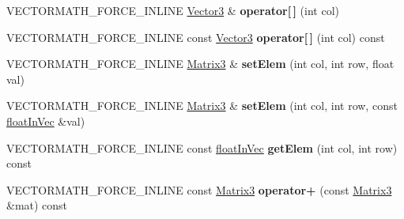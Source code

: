 \begin{DoxyCompactItemize}
\mbox{\label{classVectormath_1_1Aos_1_1Matrix3_a6978cc9868019aedcbd3eeaf9f5d48f1}} 
V\+E\+C\+T\+O\+R\+M\+A\+T\+H\+\_\+\+F\+O\+R\+C\+E\+\_\+\+I\+N\+L\+I\+NE \hyperlink{classVectormath_1_1Aos_1_1Vector3}{Vector3} \& {\bfseries operator\mbox{[}$\,$\mbox{]}} (int col)
\item 
\mbox{\label{classVectormath_1_1Aos_1_1Matrix3_a27d8097fac73c3eba26c01cb94c68c55}} 
V\+E\+C\+T\+O\+R\+M\+A\+T\+H\+\_\+\+F\+O\+R\+C\+E\+\_\+\+I\+N\+L\+I\+NE const \hyperlink{classVectormath_1_1Aos_1_1Vector3}{Vector3} {\bfseries operator\mbox{[}$\,$\mbox{]}} (int col) const
\item 
\mbox{\label{classVectormath_1_1Aos_1_1Matrix3_a89e00faa17e4db55404b11de366862d6}} 
V\+E\+C\+T\+O\+R\+M\+A\+T\+H\+\_\+\+F\+O\+R\+C\+E\+\_\+\+I\+N\+L\+I\+NE \hyperlink{classVectormath_1_1Aos_1_1Matrix3}{Matrix3} \& {\bfseries set\+Elem} (int col, int row, float val)
\item 
\mbox{\label{classVectormath_1_1Aos_1_1Matrix3_adc91303151f2058aed8fa32517d74a59}} 
V\+E\+C\+T\+O\+R\+M\+A\+T\+H\+\_\+\+F\+O\+R\+C\+E\+\_\+\+I\+N\+L\+I\+NE \hyperlink{classVectormath_1_1Aos_1_1Matrix3}{Matrix3} \& {\bfseries set\+Elem} (int col, int row, const \hyperlink{classVectormath_1_1floatInVec}{float\+In\+Vec} \&val)
\item 
\mbox{\label{classVectormath_1_1Aos_1_1Matrix3_aef72a6899878fe187382f28a9aa260ff}} 
V\+E\+C\+T\+O\+R\+M\+A\+T\+H\+\_\+\+F\+O\+R\+C\+E\+\_\+\+I\+N\+L\+I\+NE const \hyperlink{classVectormath_1_1floatInVec}{float\+In\+Vec} {\bfseries get\+Elem} (int col, int row) const
\item 
\mbox{\label{classVectormath_1_1Aos_1_1Matrix3_a3bdfadc5563b117e1bfd5603e9ad3f86}} 
V\+E\+C\+T\+O\+R\+M\+A\+T\+H\+\_\+\+F\+O\+R\+C\+E\+\_\+\+I\+N\+L\+I\+NE const \hyperlink{classVectormath_1_1Aos_1_1Matrix3}{Matrix3} {\bfseries operator+} (const \hyperlink{classVectormath_1_1Aos_1_1Matrix3}{Matrix3} \&mat) const
\item 
\mbox{\label{classVectormath_1_1Aos_1_1Matrix3_ac1dd0ae158da37a832ee30c01ccc8b37}} 

\end{DoxyCompactItemize}
